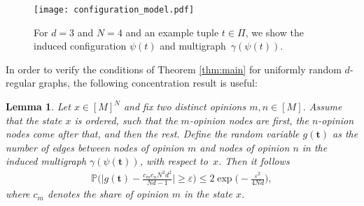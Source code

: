 \documentclass[a4paper,
               10pt,
               pdftex,
               normalheadings,
               headsepline,
               footsepline,
               headinclude,
               footinclude,
               DIV=14,
               abstracton]
{scrartcl}
\newtheorem{lemma}[theorem]{Lemma}
\newcommand{\rv}[1]{\bm{#1}}
\begin{document}
\begin{figure}
\centering
\texttt{[image: configuration\_model.pdf]}
\caption{For $d=3$ and $N=4$ and an example tuple $t \in \Pi$, we show the induced configuration $\psi(t)$ and multigraph~$\gamma(\psi(t))$.}
\label{fig:configuration_model}
\end{figure}

In order to verify the conditions of Theorem \ref{thm:main} for uniformly random $d$-regular graphs, the following concentration result is useful:
\begin{lemma} \label{lemma:concentration_configurationmodel}
Let $x \in [M]^N$ and fix two distinct opinions $m,n \in [M]$. Assume that the state $x$ is ordered, such that the $m$-opinion nodes are first, the $n$-opinion nodes come after that, and then the rest.
Define the random variable $g(\rv{t})$ as the number of edges between nodes of opinion $m$ and nodes of opinion $n$ in the induced multigraph $\gamma(\psi(\rv{t}))$, with respect to~$x$. Then it follows
\begin{align}
        \mathbb{P}\Bigg( \bigg|g(\rv{t}) -  \frac{c_m c_n N^2 d^2}{Nd - 1}\bigg| \geq \varepsilon \Bigg) \leq 2 \exp\Big(-\frac{\varepsilon^2}{4 Nd}\Big),
\end{align}
where $c_m$ denotes the share of opinion $m$ in the state $x$.
\end{lemma}
\end{document}
